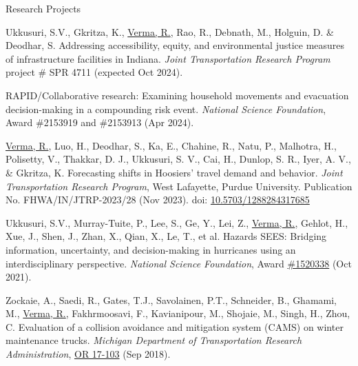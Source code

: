 \documentclass{CV} %
\begin{document}
\begin{rSection}{Research Projects}
    \begin{etaremune}
        \item Ukkusuri, S.V., Gkritza, K., \underline{Verma, R.}, Rao, R., Debnath, M., Holguin, D. \& Deodhar, S. Addressing accessibility, equity, and environmental justice measures of infrastructure facilities in Indiana. \textit{Joint Transportation Research Program} project \# SPR 4711 (expected Oct 2024).
        
        \item RAPID/Collaborative research: Examining household movements and evacuation decision-making in a compounding risk event. \textit{National Science Foundation}, Award \#2153919 and \#2153913 (Apr 2024).

        \item \underline{Verma, R.}, Luo, H., Deodhar, S., Ka, E., Chahine, R., Natu, P., Malhotra, H., Polisetty, V., Thakkar, D. J., Ukkusuri, S. V., Cai, H., Dunlop, S. R., Iyer, A. V., \& Gkritza, K. Forecasting shifts in Hoosiers' travel demand and behavior. \textit{Joint Transportation Research Program}, West Lafayette, Purdue University. Publication No. FHWA/IN/JTRP-2023/28 (Nov 2023). doi: \href{https://doi.org/10.5703/1288284317685}{10.5703/1288284317685}

        \item Ukkusuri, S.V., Murray-Tuite, P., Lee, S., Ge, Y., Lei, Z., \underline{Verma, R.}, Gehlot, H., Xue, J., Shen, J., Zhan, X., Qian, X., Le, T., et al. Hazards SEES: Bridging information, uncertainty, and decision-making in hurricanes using an interdisciplinary perspective. \textit{National Science Foundation}, Award \href{https://www.nsf.gov/awardsearch/showAward?AWD_ID=1520338}{\#1520338} (Oct 2021).
        
        \item Zockaie, A., Saedi, R., Gates, T.J., Savolainen, P.T., Schneider, B., Ghamami, M., \underline{Verma, R.}, Fakhrmoosavi, F., Kavianipour, M., Shojaie, M., Singh, H., Zhou, C. Evaluation of a collision avoidance and mitigation system (CAMS) on winter maintenance trucks. \textit{Michigan Department of Transportation Research Administration}, \href{https://rosap.ntl.bts.gov/view/dot/42752}{OR 17-103} (Sep 2018).
    \end{etaremune}

\end{rSection}
\end{document}
